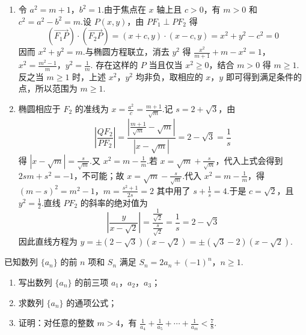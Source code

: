 \begin{solution}
\begin{enumerate}
\item 令 \(a^2=m+1\)，\(b^2=1\).由于焦点在 \(x\) 轴上且 \(c>0\)，有 \(m>0\) 和 \(c^2=a^2-b^2=m\).设 \(P(x,y)\)，由 \(PF_1\perp PF_2\) 得
\[
(\overrightarrow{F_1P})\cdot(\overrightarrow{F_2P})=(x+c,y)\cdot(x-c,y)=x^2+y^2-c^2=0
\]
因而 \(x^2+y^2=m\).与椭圆方程联立，消去 \(y^2\) 得
\(\frac{x^2}{m+1}+m-x^2=1\)，\(x^2=\frac{m^2-1}{m}\)，\(y^2=\frac1m\).
存在这样的 \(P\) 当且仅当 \(x^2\geqslant0\)，结合 \(m>0\) 得 \(m\geqslant1\).反之当 \(m\geqslant1\) 时，上述 \(x^2\)，\(y^2\) 均非负，取相应的 \(x\)，\(y\) 即可得到满足条件的点，所以范围为 \(m\geqslant1\).
\item 椭圆相应于 \(F_2\) 的准线为 \(x=\frac{a^2}{c}=\frac{m+1}{\sqrt m}\).记 \(s=2+\sqrt3\)，由
\[
\left|\frac{QF_2}{PF_2}\right|=\frac{\left|\frac{m+1}{\sqrt m}-\sqrt m\right|}{|x-\sqrt m|}=2-\sqrt3=\frac1s
\]
得 \(|x-\sqrt m|=\frac{s}{\sqrt m}\).又 \(x^2=m-\frac1m\).若 \(x=\sqrt m+\frac{s}{\sqrt m}\)，代入上式会得到 \(2s m+s^2=-1\)，不可能；故 \(x=\sqrt m-\frac{s}{\sqrt m}\).代入 \(x^2=m-\frac1m\)，得
\((m-s)^2=m^2-1\)，\(m=\frac{s^2+1}{2s}=2\)
其中用了 \(s+\frac1s=4\).于是 \(c=\sqrt2\)，且 \(y^2=\frac12\).直线 \(PF_2\) 的斜率的绝对值为
\[
\left|\frac{y}{x-\sqrt2}\right|=\frac{\frac{1}{\sqrt2}}{\frac{s}{\sqrt2}}=\frac1s=2-\sqrt3
\]
因此直线方程为 \(y=\pm(2-\sqrt3)(x-\sqrt2)=\pm(\sqrt3-2)(x-\sqrt2)\).
\end{enumerate}
\end{solution}

\begin{problem}
已知数列 \(\{a_{n}\}\) 的前 \(n\) 项和 \(S_{n}\) 满足 \(S_{n} = 2a_{n} + (-1)^{n}\)，\(n \geqslant 1\).

\begin{enumerate}
\item 写出数列 \(\{a_{n}\}\) 的前三项 \(a_{1}\)，\(a_{2}\)，\(a_{3}\)；
\item 求数列 \(\{a_{n}\}\) 的通项公式；
\item 证明：对任意的整数 \(m > 4\)，有 \(\frac{1}{a_4} + \frac{1}{a_5} + \cdots + \frac{1}{a_m} < \frac{7}{8}\).
\end{enumerate}
\end{problem}

